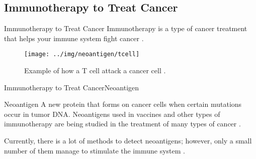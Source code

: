\documentclass[10pt]{beamer}
\newcommand{\1}{
	\setbeamertemplate{background}{
		\texttt{[image: ../img/1]}
		\tikz[overlay] \fill[fill opacity=0.75,fill=white] (0,0) rectangle (-\paperwidth,\paperheight);
	}
}
\begin{document}
	
	\subsection{Immunotherapy to Treat Cancer}
	
	\begin{frame}{Immunotherapy to Treat Cancer}{}		
		Immunotherapy is a type of cancer treatment that helps your immune system fight cancer \cite{inmunoterapy2022}.
		
		\begin{figure}
			\texttt{[image: ../img/neoantigen/tcell]}
			\caption{Example of how a T cell attack a cancer cell \cite{nortshore2022}.}
		\end{figure}		
	\end{frame}
	
	\begin{frame}{Immunotherapy to Treat Cancer}{Neoantigen}		
		\begin{block}{Neoantigen}
			A new protein that forms on cancer cells when certain mutations occur in tumor DNA. Neoantigens used in vaccines and other types of immunotherapy are being studied in the treatment of many types of cancer \cite{NCIdictionary2022, borden2022cancer}.
		\end{block} 
		\begin{block}{}
			Currently, there is a lot of methods to detect neoantigens; however, only a small number of them manage to stimulate the immune system \cite{chen2021challenges, hao2021improvement}.
		\end{block}
	\end{frame}
	
\end{document}
